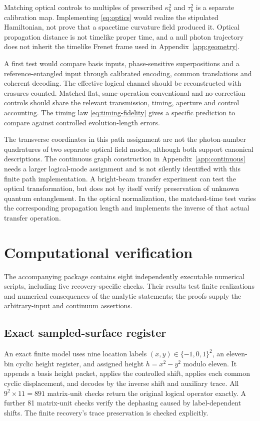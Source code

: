 \documentclass[aip,adv,reprint,onecolumn,amsmath,amssymb]{revtex4-2}
\begin{document}
Matching optical controls to multiples of prescribed $\kappa_b^2$ and $\tau_b^2$ is a separate calibration map. Implementing \eqref{eq:optics} would realize the stipulated Hamiltonian, not prove that a spacetime curvature field produced it. Optical propagation distance is not timelike proper time, and a null photon trajectory does not inherit the timelike Frenet frame used in Appendix~\ref{app:geometry}.

A first test would compare basis inputs, phase-sensitive superpositions and a reference-entangled input through calibrated encoding, common translations and coherent decoding. The effective logical channel should be reconstructed with erasures counted. Matched flat, same-operation conventional and no-correction controls should share the relevant transmission, timing, aperture and control accounting. The timing law \eqref{eq:timing-fidelity} gives a specific prediction to compare against controlled evolution-length errors.


The transverse coordinates in this path assignment are not the photon-number quadratures of two separate optical field modes, although both support canonical descriptions.\cite{braunstein} The continuous graph construction in Appendix~\ref{app:continuous} needs a larger logical-mode assignment and is not silently identified with this finite path implementation. A bright-beam transfer experiment can test the optical transformation, but does not by itself verify preservation of unknown quantum entanglement. In the optical normalization, the matched-time test varies the corresponding propagation length and implements the inverse of that actual transfer operation.
\section{Computational verification}
\label{sec:checks}
The accompanying package contains eight independently executable numerical scripts, including five recovery-specific checks. Their results test finite realizations and numerical consequences of the analytic statements; the proofs supply the arbitrary-input and continuum assertions.

\subsection{Exact sampled-surface register}
An exact finite model uses nine location labels $(x,y)\in\{-1,0,1\}^2$, an eleven-bin cyclic height register, and assigned height $h=x^2-y^2$ modulo eleven. It appends a basis height packet, applies the controlled shift, applies each common cyclic displacement, and decodes by the inverse shift and auxiliary trace. All $9^2\times11=891$ matrix-unit checks return the original logical operator exactly. A further 81 matrix-unit checks verify the dephasing caused by label-dependent shifts. The finite recovery's trace preservation is checked explicitly.
\end{document}
